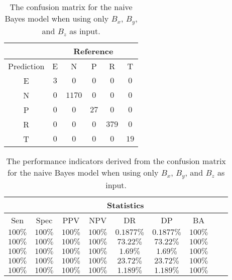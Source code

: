 \begin{table}[!ht]
	\centering
	\begin{tabular}{|c|c|c|c|c|c|}
		\hline
		 & \multicolumn{5}{|c|}{Reference} \\ \hline
		 Prediction & E & N & P & R & T \\ \hline
		 E & $3$ & $0$ & $0$ & $0$ & $0$ \\ \hline
		 N & $0$ & $1170$ & $0$ & $0$ & $0$ \\ \hline
		 P & $0$ & $0$ & $27$ & $0$ & $0$ \\ \hline
		 R & $0$ & $0$ & $0$ & $379$ & $0$ \\ \hline
		 T & $0$ & $0$ & $0$ & $0$ & $19$ \\ \hline
	\end{tabular}
	\caption{The confusion matrix for the naive Bayes model when using only $B_{x}$, $B_{y}$, and $B_{z}$ as input.}
	\label{tab:cm:coord:nb}
\end{table}

\begin{table}[!ht]
	\centering
	\begin{tabular}{|c|c|c|c|c|c|c|c|c|}
		\hline
		 & \multicolumn{7}{c|}{Statistics} \\ \hline
		Sen & Spec & PPV & NPV & DR & DP & BA \\ \hline
		$100\%$ & $100\%$ & $100\%$ & $100\%$ & $0.1877\%$ & $0.1877\%$ & $100\%$ \\ \hline
		$100\%$ & $100\%$ & $100\%$ & $100\%$ & $73.22\%$ & $73.22\%$ & $100\%$ \\ \hline
		$100\%$ & $100\%$ & $100\%$ & $100\%$ & $1.69\%$ & $1.69\%$ & $100\%$ \\ \hline
		$100\%$ & $100\%$ & $100\%$ & $100\%$ & $23.72\%$ & $23.72\%$ & $100\%$ \\ \hline
		$100\%$ & $100\%$ & $100\%$ & $100\%$ & $1.189\%$ & $1.189\%$ & $100\%$ \\ \hline
	\end{tabular}
	\caption{The performance indicators derived from the confusion matrix for the naive Bayes model when using only $B_{x}$, $B_{y}$, and $B_{z}$ as input.}
	\label{tab:cs:coord:nb}
\end{table}

